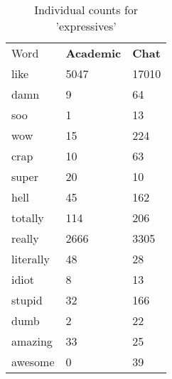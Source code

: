 \documentclass[11pt,twoside]{article}
\begin{document}
\begin{table}[t]
\caption{Individual counts for 'expressives'}\label{icounts}
\begin{center}
\begin{tabular}{|l|l|l|}
    \hline
Word & \textbf{Academic} &\textbf{Chat}\\
like& 5047& 17010\\ 
damn& 9 & 64 \\
soo& 1 & 13 \\
wow& 15 &224\\
crap& 10 &63\\
super& 20 & 10\\
hell& 45 & 162\\
totally& 114 & 206\\
really& 2666 & 3305\\
literally& 48 &28\\
idiot& 8 & 13\\
stupid& 32 & 166\\
dumb& 2 & 22\\
amazing& 33 & 25\\
awesome& 0 & 39\\
   \hline
\end{tabular}
\end{center}
\end{table}
\end{document}
